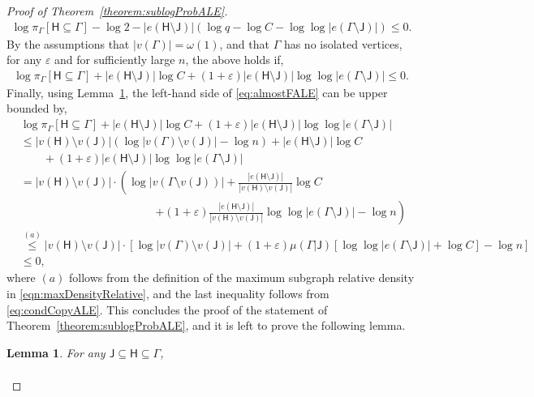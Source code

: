 \documentclass[12pt]{article}
\newtheorem{lemma}{Lemma}
\newcommand{\p}[1]{\left(#1\right)}
\newcommand{\pp}[1]{\left[#1\right]}
\newcommand{\s}[1]{\mathsf{#1}}
\begin{document}
\begin{proof}[Proof of Theorem~\ref{theorem:sublogProbALE}]
    \begin{align}
        \log \pi_\Gamma[\s{H}\subseteq \Gamma]-\log2-|e(\s{H}\setminus\s{J})|\p{\log q -\log C-\log\log|e(\Gamma\setminus\s{J})|}\leq 0.
    \end{align}
    By the assumptions that $|v(\Gamma)|=\omega(1)$, and that $\Gamma$ has no isolated vertices, for any $\varepsilon$ and for sufficiently large $n$, the above holds if, 
    \begin{align}
        \log \pi_\Gamma[\s{H}\subseteq \Gamma]+|e(\s{H}\setminus\s{J})|\log C+(1+\varepsilon)|e(\s{H}\setminus\s{J})|\log\log|e(\Gamma\setminus\s{J})|\leq 0.\label{eq:almostFALE}
    \end{align}
    Finally, using Lemma~\ref{lem:probcalc2Alsmot}, the left-hand side of \eqref{eq:almostFALE} can be upper bounded by,
    \begin{align}
        &\log \pi_\Gamma[\s{H}\subseteq \Gamma]+|e(\s{H}\setminus\s{J})|\log C+(1+\varepsilon)|e(\s{H}\setminus\s{J})|\log\log|e(\Gamma\setminus\s{J})|\\
        &\leq |v(\s{H})\setminus v(\s{J})|\p{\log|v(\Gamma)\setminus v(\s{J})|-\log n}+|e(\s{H}\setminus\s{J})|\log C\nonumber\\
        &\qquad+(1+\varepsilon)|e(\s{H}\setminus\s{J})|\log\log|e(\Gamma\setminus\s{J})|\\
        &=|v(\s{H})\setminus v(\s{J})|\cdot \left(\log|v(\Gamma\setminus v(\s{J}))|+\frac{|e(\s{H}\setminus\s{J})|}{|v(\s{H})\setminus v(\s{J})|}\log C\right.\nonumber\\
        &\hspace{5cm}\left.+(1+\varepsilon)\frac{|e(\s{H}\setminus\s{J})|}{|v(\s{H})\setminus v(\s{J})|} \log \log|e(\Gamma\setminus\s{J})| -\log n\right)\\
        &\overset{(a)}{\leq}|v(\s{H})\setminus v(\s{J})|\cdot\pp{\log|v(\Gamma)\setminus v(\s{J})|+(1+\varepsilon)\mu(\Gamma\vert\s{J})\pp{\log\log|e(\Gamma\setminus\s{J})|+\log C} -\log n}\\
        &\leq 0,
    \end{align}
    where $(a)$ follows from the definition of the maximum subgraph relative density in \eqref{eqn:maxDensityRelative}, and the last inequality follows from \eqref{eq:condCopyALE}. This concludes the proof of the statement of Theorem~\ref{theorem:sublogProbALE}, and it is left to prove the following lemma.
\begin{lemma}\label{lem:probcalc2Alsmot} For any $\s{J}\subseteq\s{H}\subseteq \Gamma$,
\begin{align}

\end{align}
\end{lemma}
\end{proof}
\end{document}
